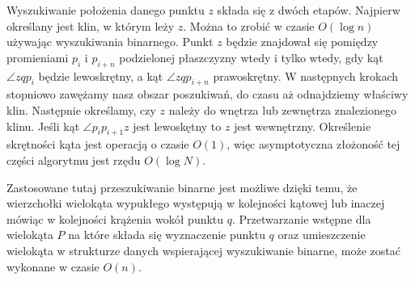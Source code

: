 Wyszukiwanie położenia danego punktu $z$ składa się z dwóch
etapów. Najpierw określany jest klin, w którym leży $z$. Można to
zrobić w czasie $O(\log n)$ używając wyszukiwania binarnego. Punkt $z$
będzie znajdował się pomiędzy promieniami $p_i$ i $p_{i+n}$
podzielonej płaszczyzny wtedy i tylko wtedy, gdy kąt $\angle zqp_i$
będzie lewoskrętny, a kąt $\angle zqp_{i+n}$ prawoskrętny. W
następnych krokach stopniowo zawężamy nasz obszar poszukiwań, do czasu
aż odnajdziemy właściwy klin. Następnie określamy, czy $z$ należy do
wnętrza lub zewnętrza znalezionego klinu. Jeśli kąt $\angle p_{i}p_{i+1}z$
jest lewoskętny to $z$ jest wewnętrzny. Określenie skrętności kąta
jest operacją o czasie $O(1)$, więc asymptotyczna złożoność tej części
algorytmu jest rzędu $O(\log N)$.

Zastosowane tutaj przeszukiwanie binarne jest możliwe dzięki temu, że
wierzchołki wielokąta wypukłego występują w kolejności kątowej lub
inaczej mówiąc w kolejności krążenia wokół punktu $q$. Przetwarzanie
wstępne dla wielokąta $P$ na które składa się wyznaczenie punktu $q$
oraz umieszczenie wielokąta w strukturze danych wspierającej
wyszukiwanie binarne, może zostać wykonane w czasie $O(n)$.

